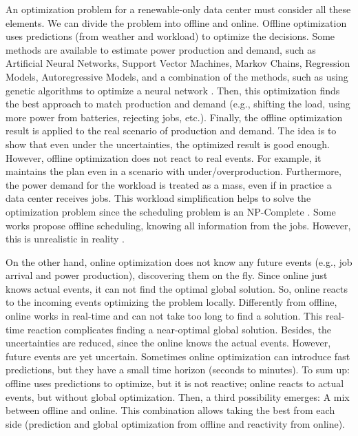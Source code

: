 An optimization problem for a renewable-only data center must consider all these elements. We can divide the problem into offline and online. Offline optimization uses predictions (from weather and workload) to optimize the decisions. Some methods are available to estimate power production and demand, such as Artificial Neural Networks, Support Vector Machines, Markov Chains, Regression Models, Autoregressive Models, and a combination of the methods, such as using genetic algorithms to optimize a neural network \cite{vashistha2020literature, masdari2020survey, ssekulima2016wind, sharma2018review, tuohy2015solar}. Then, this optimization finds the best approach to match production and demand (e.g., shifting the load, using more power from batteries, rejecting jobs, etc.). Finally, the offline optimization result is applied to the real scenario of production and demand. The idea is to show that even under the uncertainties, the optimized result is good enough. However, offline optimization does not react to real events. For example, it maintains the plan even in a scenario with under/overproduction. Furthermore, the power demand for the workload is treated as a mass, even if in practice a data center receives jobs. This workload simplification helps to solve the optimization problem since the scheduling problem is an NP-Complete \cite{robert2009introduction, agrawal2021energy}. Some works propose offline scheduling, knowing all information from the jobs. However, this is unrealistic in reality \cite{robert2009introduction}.

On the other hand, online optimization does not know any future events (e.g., job arrival and power production), discovering them on the fly. Since online just knows actual events, it can not find the optimal global solution. So, online reacts to the incoming events optimizing the problem locally. Differently from offline, online works in real-time and can not take too long to find a solution. This real-time reaction complicates finding a near-optimal global solution. Besides, the uncertainties are reduced, since the online knows the actual events. However, future events are yet uncertain. Sometimes online optimization can introduce fast predictions, but they have a small time horizon (seconds to minutes). To sum up: offline uses predictions to optimize, but it is not reactive; online reacts to actual events, but without global optimization. Then, a third possibility emerges: A mix between offline and online. This combination allows taking the best from each side (prediction and global optimization from offline and reactivity from online).

